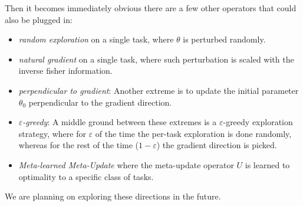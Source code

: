 \documentclass{article} %
\begin{document}
{Then it becomes immediately obvious there are a few other operators that could also be plugged in:
\begin{itemize}
    \item \emph{random exploration} on a single task, where $\theta$ is perturbed randomly.
    \item \emph{natural gradient} on a single task, where such perturbation is scaled with the inverse fisher information.
    \item \emph{perpendicular to gradient}: Another extreme is to update the initial parameter $\theta_0$ perpendicular to the gradient direction. 
    \item \emph{$\varepsilon$-greedy}: A middle ground between these extremes is a $\varepsilon$-greedy exploration strategy, where for $\varepsilon$ of the time the per-task exploration is done randomly, whereas for the rest of the time ($1-\varepsilon$) the gradient direction is picked.
    \item \emph{Meta-learned Meta-Update} where the meta-update operator $U$ is learned to optimality to a specific class of tasks.
\end{itemize}

We are planning on exploring these directions in the future.





}
\end{document}
